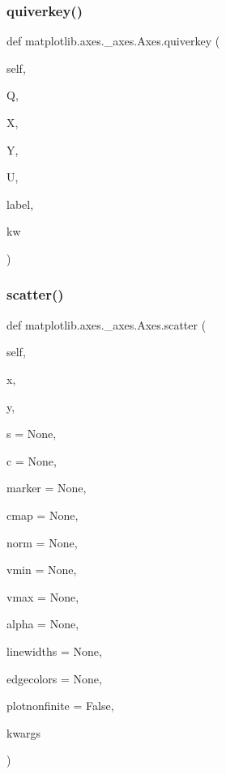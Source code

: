 \begin{DoxyVerb}
\subsubsection{\texorpdfstring{quiverkey()}{quiverkey()}}
{\footnotesize\ttfamily def matplotlib.\+axes.\+\_\+axes.\+Axes.\+quiverkey (\begin{DoxyParamCaption}\item[{}]{self,  }\item[{}]{Q,  }\item[{}]{X,  }\item[{}]{Y,  }\item[{}]{U,  }\item[{}]{label,  }\item[{}]{kw }\end{DoxyParamCaption})}

\mbox{\label{classmatplotlib_1_1axes_1_1__axes_1_1Axes_a8cb331908d3ec822cecc7f7c975af6b6}} 
\subsubsection{\texorpdfstring{scatter()}{scatter()}}
{\footnotesize\ttfamily def matplotlib.\+axes.\+\_\+axes.\+Axes.\+scatter (\begin{DoxyParamCaption}\item[{}]{self,  }\item[{}]{x,  }\item[{}]{y,  }\item[{}]{s = {\ttfamily None},  }\item[{}]{c = {\ttfamily None},  }\item[{}]{marker = {\ttfamily None},  }\item[{}]{cmap = {\ttfamily None},  }\item[{}]{norm = {\ttfamily None},  }\item[{}]{vmin = {\ttfamily None},  }\item[{}]{vmax = {\ttfamily None},  }\item[{}]{alpha = {\ttfamily None},  }\item[{}]{linewidths = {\ttfamily None},  }\item[{}]{edgecolors = {\ttfamily None},  }\item[{}]{plotnonfinite = {\ttfamily False},  }\item[{}]{kwargs }\end{DoxyParamCaption})}


\end{DoxyVerb}
